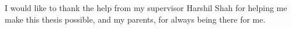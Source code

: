 \begin{acknowledgements}
I would like to thank the help from my supervisor Harshil Shah for helping me
make this thesis possible, and my parents, for always being there for me.
\end{acknowledgements}

\setcounter{tocdepth}{2} 

\tableofcontents
\listoffigures
\listoftables
